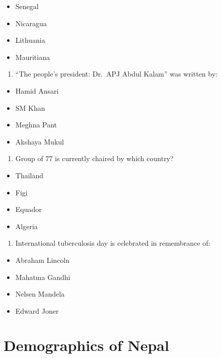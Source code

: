 \documentclass[]{book}
\providecommand{\tightlist}{%
  \setlength{\itemsep}{0pt}\setlength{\parskip}{0pt}}
\begin{document}
\begin{itemize}
\tightlist
\item
  Senegal
\item
  Nicaragua
\item
  Lithuania
\item
  Mauritiana
\end{itemize}

\begin{enumerate}
\def\labelenumi{\arabic{enumi}.}
\setcounter{enumi}{7}
\tightlist
\item
  ``The people's president: Dr.~APJ Abdul Kalam'' was written by:
\end{enumerate}

\begin{itemize}
\tightlist
\item
  Hamid Ansari
\item
  SM Khan
\item
  Meghna Pant
\item
  Akshaya Mukul
\end{itemize}

\begin{enumerate}
\def\labelenumi{\arabic{enumi}.}
\setcounter{enumi}{8}
\tightlist
\item
  Group of 77 is currently chaired by which country?
\end{enumerate}

\begin{itemize}
\tightlist
\item
  Thailand
\item
  Figi
\item
  Equador
\item
  Algeria
\end{itemize}

\begin{enumerate}
\def\labelenumi{\arabic{enumi}.}
\setcounter{enumi}{9}
\tightlist
\item
  International tuberculosis day is celebrated in remembrance of:
\end{enumerate}

\begin{itemize}
\tightlist
\item
  Abraham Lincoln
\item
  Mahatma Gandhi
\item
  Nelsen Mandela
\item
  Edward Joner
\end{itemize}

\hypertarget{demographics-of-nepal}{%
\section{Demographics of Nepal}\label{demographics-of-nepal}}
\end{document}
